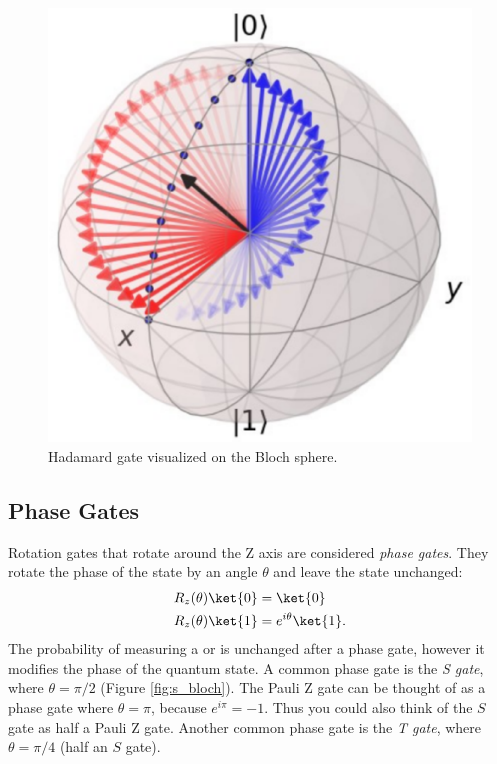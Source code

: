 \documentclass[11pt, notitlepage]{report}
\begin{document}
\begin{figure}[ht]
    \centering
    \includegraphics[scale=0.165]{images/hadamard_gate.eps}
    \vspace{1mm}
    \caption{Hadamard gate visualized on the Bloch sphere.}
\end{figure}

\subsection{Phase Gates}
Rotation gates that rotate around the Z axis are considered \emph{phase gates}. They rotate the phase of the  state by an angle $\theta$ and leave the  state unchanged:
\begin{equation}
\begin{aligned}
R_z(\theta) \ket{0} &= \ket{0} \\
R_z(\theta) \ket{1} &= e^{i\theta}\ket{1}.
\end{aligned}
\end{equation}
The probability of measuring a  or  is unchanged after a phase gate, however it modifies the phase of the quantum state. A common phase gate is the \emph{S gate}, where $\theta = \pi/2$ (Figure \ref{fig:s_bloch}). The Pauli Z gate can be thought of as a phase gate where $\theta = \pi$, because $e^{i\pi} = -1$. Thus you could also think of the $S$ gate as half a Pauli Z gate. Another common phase gate is the \emph{T gate}, where $\theta = \pi/4$ (half an $S$ gate).
\end{document}
